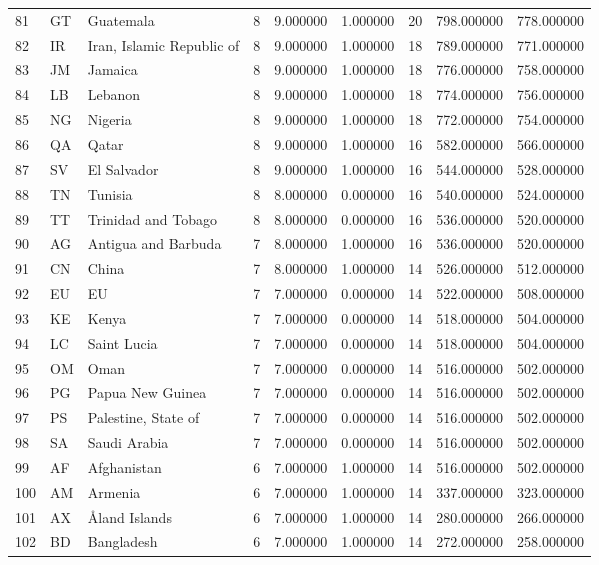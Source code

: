 \begin{tabular}{lllrrrrrr}
81 & GT & Guatemala & 8 & 9.000000 & 1.000000 & 20 & 798.000000 & 778.000000 \\
82 & IR & Iran, Islamic Republic of & 8 & 9.000000 & 1.000000 & 18 & 789.000000 & 771.000000 \\
83 & JM & Jamaica & 8 & 9.000000 & 1.000000 & 18 & 776.000000 & 758.000000 \\
84 & LB & Lebanon & 8 & 9.000000 & 1.000000 & 18 & 774.000000 & 756.000000 \\
85 & NG & Nigeria & 8 & 9.000000 & 1.000000 & 18 & 772.000000 & 754.000000 \\
86 & QA & Qatar & 8 & 9.000000 & 1.000000 & 16 & 582.000000 & 566.000000 \\
87 & SV & El Salvador & 8 & 9.000000 & 1.000000 & 16 & 544.000000 & 528.000000 \\
88 & TN & Tunisia & 8 & 8.000000 & 0.000000 & 16 & 540.000000 & 524.000000 \\
89 & TT & Trinidad and Tobago & 8 & 8.000000 & 0.000000 & 16 & 536.000000 & 520.000000 \\
90 & AG & Antigua and Barbuda & 7 & 8.000000 & 1.000000 & 16 & 536.000000 & 520.000000 \\
91 & CN & China & 7 & 8.000000 & 1.000000 & 14 & 526.000000 & 512.000000 \\
92 & EU & EU & 7 & 7.000000 & 0.000000 & 14 & 522.000000 & 508.000000 \\
93 & KE & Kenya & 7 & 7.000000 & 0.000000 & 14 & 518.000000 & 504.000000 \\
94 & LC & Saint Lucia & 7 & 7.000000 & 0.000000 & 14 & 518.000000 & 504.000000 \\
95 & OM & Oman & 7 & 7.000000 & 0.000000 & 14 & 516.000000 & 502.000000 \\
96 & PG & Papua New Guinea & 7 & 7.000000 & 0.000000 & 14 & 516.000000 & 502.000000 \\
97 & PS & Palestine, State of & 7 & 7.000000 & 0.000000 & 14 & 516.000000 & 502.000000 \\
98 & SA & Saudi Arabia & 7 & 7.000000 & 0.000000 & 14 & 516.000000 & 502.000000 \\
99 & AF & Afghanistan & 6 & 7.000000 & 1.000000 & 14 & 516.000000 & 502.000000 \\
100 & AM & Armenia & 6 & 7.000000 & 1.000000 & 14 & 337.000000 & 323.000000 \\
101 & AX & Åland Islands & 6 & 7.000000 & 1.000000 & 14 & 280.000000 & 266.000000 \\
102 & BD & Bangladesh & 6 & 7.000000 & 1.000000 & 14 & 272.000000 & 258.000000 \\

\end{tabular}
